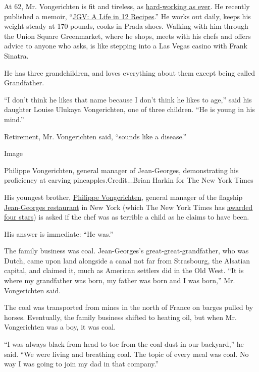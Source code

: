 At 62, Mr. Vongerichten is fit and tireless, as
\href{https://www.nytimes3xbfgragh.onion/2019/10/17/magazine/jean-georges-restaurants.html}{hard-working
as ever}. He recently published a memoir,
``\href{https://wwnorton.com/books/9780393608489}{JGV: A Life in 12
Recipes}.'' He works out daily, keeps his weight steady at 170 pounds,
cooks in Prada shoes. Walking with him through the Union Square
Greenmarket, where he shops, meets with his chefs and offers advice to
anyone who asks, is like stepping into a Las Vegas casino with Frank
Sinatra.

He has three grandchildren, and loves everything about them except being
called Grandfather.

``I don't think he likes that name because I don't think he likes to
age,'' said his daughter Louise Ulukaya Vongerichten, one of three
children. ``He is young in his mind.''

Retirement, Mr. Vongerichten said, ``sounds like a disease.''

Image

Philippe Vongerichten, general manager of Jean-Georges, demonstrating
his proficiency at carving pineapples.Credit...Brian Harkin for The New
York Times

His youngest brother,
\href{https://ny.eater.com/2011/7/15/6669497/philippe-vongerichten-looks-back-on-14-years-of-jean-georges}{Philippe
Vongerichten}, general manager of the flagship
\href{https://www.jean-georgesrestaurant.com/jean-georges/}{Jean-Georges
restaurant} in New York (which The New York Times has
\href{https://www.nytimes3xbfgragh.onion/2014/04/09/dining/restaurant-review-jean-georges-on-the-upper-west-side.html}{awarded
four stars}) is asked if the chef was as terrible a child as he claims
to have been.

His answer is immediate: ``He was.''

The family business was coal. Jean-Georges's great-great-grandfather,
who was Dutch, came upon land alongside a canal not far from Strasbourg,
the Alsatian capital, and claimed it, much as American settlers did in
the Old West. ``It is where my grandfather was born, my father was born
and I was born,'' Mr. Vongerichten said.

The coal was transported from mines in the north of France on barges
pulled by horses. Eventually, the family business shifted to heating
oil, but when Mr. Vongerichten was a boy, it was coal.

``I was always black from head to toe from the coal dust in our
backyard,'' he said. ``We were living and breathing coal. The topic of
every meal was coal. No way I was going to join my dad in that
company.''

